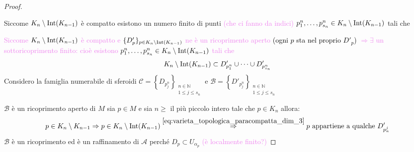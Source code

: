 \begin{proof}
\begin{center}
        \end{center}

        Siccome $K_n \setminus \operatorname{Int}(K_{n-1})$ è compatto esistono un numero finito di punti 
        \textcolor{violet}{(che ci fanno da indici)} $p_1^n, \dots, p_{s_n}^n \in K_n \setminus \operatorname{Int}(K_{n-1})$ tali che

        \textcolor{violet}{Siccome $K_n \setminus \operatorname{Int}(K_{n-1})$ è compatto e
        $\{D'_p\}_{p \in K_n \setminus \operatorname{Int}(K_{n-1})}$ ne è un ricoprimento aperto
        \textcolor{black}{(ogni $p$ sta nel proprio $D'_p$)} $\Rightarrow \exists$ un sottoricoprimento finito:
        cioè esistono $p_1^n, \dots, p_{s_n}^n \in K_n \setminus \operatorname{Int}(K_{n-1})$ tali che}
        \begin{equation}
        \label{eq:varieta_topologica_paracompatta_dim_3}
        K_n \setminus \operatorname{Int}(K_{n-1}) \subset D'_{p_1^n} \cup \dots \cup D'_{p_{s_n}^n}
        \end{equation}
        Considero la famiglia numerabile di sferoidi $\mathcal{C}=\left\{D_{p_j^n}\right\} _{\substack{n \in \mathbb{N} \\ 1 \leq j \leq s_n}}$ 
        e  $\mathcal{B}=\left\{D'_{p_j^n}\right\} _{\substack{n \in \mathbb{N} \\ 1 \leq j \leq s_n}}$
        
        $\mathcal{B}$ è un ricoprimento aperto di $M$ sia $p \in M$ e sia $n \geq$ il più piccolo intero tale che $p \in K_n$ allora:
        \[ p \in K_n \setminus K_{n-1} \Rightarrow p \in K_n \setminus \operatorname{Int}(K_{n-1}) \overset{\eqref{eq:varieta_topologica_paracompatta_dim_3}}{\Rightarrow} p \text{ appartiene a qualche } D'_{p^j_n} \]
        $\mathcal{B}$ è un ricoprimento ed è un raffinamento di $\mathcal{A}$ perché $D_p \subset U_{\alpha_p}$ \textcolor{violet}{(è localmente finito?)}


\end{proof}
